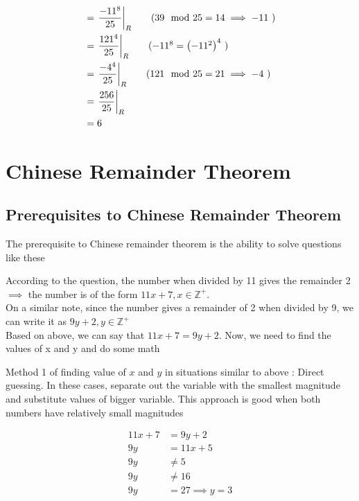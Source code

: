 \begin{align*}
    &= \remFrac{-11^{8}}{25} \tag{$39 \mod 25 = 14 \implies -11$ } \\
    &= \remFrac{121^{4}}{25} \tag{$-11^8 = \bigParen{-11^{2}}^4$ } \\
    &= \remFrac{-4^{4}}{25} \tag{$121 \mod 25 = 21 \implies -4$ } \\
    &= \remFrac{256}{25} \\
    &= 6
\end{align*}

\section{Chinese Remainder Theorem}

\subsection{Prerequisites to Chinese Remainder Theorem}

The prerequisite to Chinese remainder theorem is the ability to solve questions like these


According to the question, the number when divided by 11 gives the remainder 2 $\implies$ the number is of the form $11x + 7 , x \in \mathbb{Z^{+}}$. \\

On a similar note, since the number gives a remainder of 2 when divided by 9, we can write it as $9y + 2, y \in \mathbb{Z^{+}}$ \\

Based on above, we can say that $11x + 7 = 9y + 2$. Now, we need to find the values of x and y and do some math

\begin{NOTE}
    Method 1 of finding value of $x$ and $y$ in situations similar to above : Direct guessing. In these cases, separate out the variable with the smallest magnitude and substitute values of bigger variable. This approach is good when both numbers have relatively small magnitudes
\end{NOTE}

\begin{align*}
    11x + 7 &= 9y + 2 \\
    9y &= 11x + 5 \\ 
    9y &\neq 5 \tag{x = 0. $y$ is an integer} \\
    9y &\neq 16 \tag{x = 1. $y$ is an integer} \\ 
    9y &= 27 \implies y = 3 \tag{x = 2. $y$ is an integer}
\end{align*}

